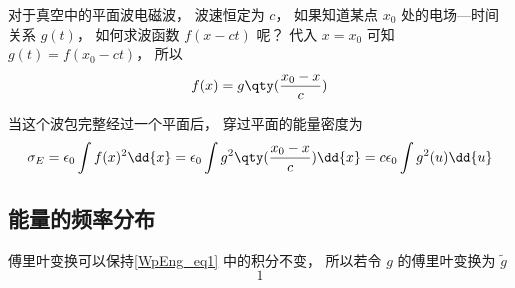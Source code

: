 
对于真空中的平面波电磁波， 波速恒定为 $c$， 如果知道某点 $x_0$ 处的电场—时间关系 $g(t)$， 如何求波函数 $f(x - ct)$ 呢？ 代入 $x = x_0$ 可知 $g(t) = f(x_0 - ct)$， 所以
\begin{equation}
f(x) = g\qty(\frac{x_0 - x}{c})
\end{equation}

当这个波包完整经过一个平面后， 穿过平面的能量密度为
\begin{equation}\label{WpEng_eq1}
\sigma_E = \epsilon_0 \int f(x)^2 \dd{x} = \epsilon_0  \int g^2\qty(\frac{x_0 - x}{c}) \dd{x} = c\epsilon_0 \int g^2(u) \dd{u}
\end{equation}

\subsection{能量的频率分布}
傅里叶变换可以保持\autoref{WpEng_eq1} 中的积分不变， 所以若令 $g$ 的傅里叶变换为 $\tilde g$
\begin{equation}
1
\end{equation}

